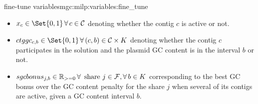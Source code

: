 \begin{definition}{\MGC{} fine-tune variables}{mgc:milp:variables:fine_tune}
  \begin{itemize}
    \item \(x_c \in \Set{0, 1} \, \forall c \in \Contigs{}\) denoting whether the contig \(c\) is active or not.
    \item \(\ctggc{c}{b} \in \Set{0, 1} \, \forall (c, b) \in \Contigs{} \times K\) denoting whether the contig \(c\) participates in the solution and the plasmid GC content is in the interval \(b\) or not.
    \item \(\sgcbonus{j}{b} \in \Reals_{>=0} \, \forall \text{ share } j \in \Fragments{}, \forall b \in K\) corresponding to the best GC bonus over the GC content penalty for the share \(j\) when several of its contigs are active, given a GC content interval \(b\).
  \end{itemize}
\end{definition}


